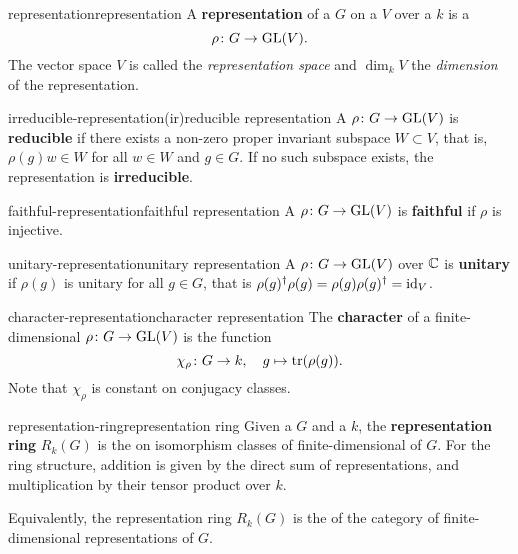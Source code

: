 \begin{topic}{representation}{representation}
    A \textbf{representation} of a  $G$ on a  $V$ over a  $k$ is a 
    \[ \rho \colon G \to \textup{GL}(V) . \]
    The vector space $V$ is called the \textit{representation space} and $\dim_k V$ the \textit{dimension} of the representation.
\end{topic}

\begin{topic}{irreducible-representation}{(ir)reducible representation}
    A  $\rho \colon G \to \textup{GL}(V)$ is \textbf{reducible} if there exists a non-zero proper invariant subspace $W \subset V$, that is, $\rho(g) w \in W$ for all $w \in W$ and $g \in G$. If no such subspace exists, the representation is \textbf{irreducible}. %
\end{topic}

\begin{topic}{faithful-representation}{faithful representation}
    A  $\rho \colon G \to \textup{GL}(V)$ is \textbf{faithful} if $\rho$ is injective.
\end{topic}

\begin{topic}{unitary-representation}{unitary representation}
    A  $\rho \colon G \to \textup{GL}(V)$ over $\mathbb{C}$ is \textbf{unitary} if $\rho(g)$ is unitary for all $g \in G$, that is $\rho(g)^\dagger \rho(g) = \rho(g) \rho(g)^\dagger = \textup{id}_V$.
\end{topic}

\begin{topic}{character-representation}{character representation}
    The \textbf{character} of a finite-dimensional  $\rho \colon G \to \textup{GL}(V)$ is the function
    \[ \chi_\rho \colon G \to k, \quad g \mapsto \textup{tr}(\rho(g)) . \]
    Note that $\chi_\rho$ is constant on conjugacy classes.
\end{topic}

\begin{topic}{representation-ring}{representation ring}
    Given a  $G$ and a  $k$, the \textbf{representation ring} $R_k(G)$ is the  on isomorphism classes of finite-dimensional  of $G$. For the ring structure, addition is given by the direct sum of representations, and multiplication by their tensor product over $k$.
    
    Equivalently, the representation ring $R_k(G)$ is the  of the category of finite-dimensional representations of $G$.
\end{topic}

